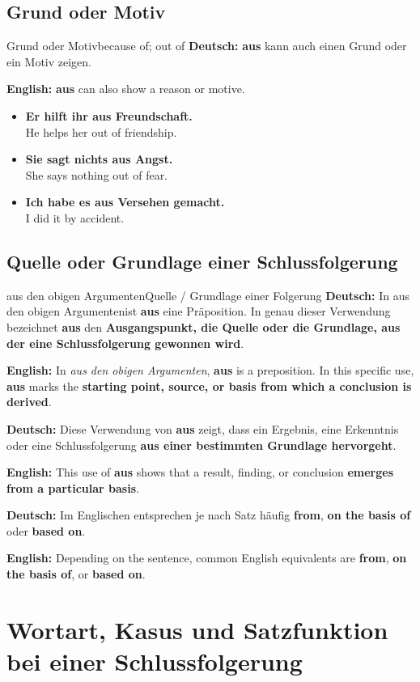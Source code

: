 \documentclass[a4paper,11pt]{article}
\newcommand{\GermanText}[1]{\textbf{Deutsch: }#1\par}
\newcommand{\EnglishText}[1]{{\small\color{SoftGray}\textbf{English: }#1\par}}
\newcommand{\ExampleItem}[2]{\item \textbf{#1}\\{\small\color{SoftGray}#2}}
\begin{document}
\subsection{Grund oder Motiv}
\begin{grammarentry}{Grund oder Motiv}{because of; out of}
\GermanText{\textbf{aus} kann auch einen Grund oder ein Motiv zeigen.}
\EnglishText{\textbf{aus} can also show a reason or motive.}
\end{grammarentry}
\begin{exbox}
\begin{itemize}
\ExampleItem{Er hilft ihr aus Freundschaft.}{He helps her out of friendship.}
\ExampleItem{Sie sagt nichts aus Angst.}{She says nothing out of fear.}
\ExampleItem{Ich habe es aus Versehen gemacht.}{I did it by accident.}
\end{itemize}
\end{exbox}

\subsection{Quelle oder Grundlage einer Schlussfolgerung}
\begin{grammarentry}{aus den obigen Argumenten}{Quelle / Grundlage einer Folgerung}
\GermanText{In \glqq aus den obigen Argumenten\grqq ist \textbf{aus} eine Präposition. In genau dieser Verwendung bezeichnet \textbf{aus} den \textbf{Ausgangspunkt, die Quelle oder die Grundlage, aus der eine Schlussfolgerung gewonnen wird}.}
\EnglishText{In \textit{aus den obigen Argumenten}, \textbf{aus} is a preposition. In this specific use, \textbf{aus} marks the \textbf{starting point, source, or basis from which a conclusion is derived}.}

\GermanText{Diese Verwendung von \textbf{aus} zeigt, dass ein Ergebnis, eine Erkenntnis oder eine Schlussfolgerung \textbf{aus einer bestimmten Grundlage hervorgeht}.}
\EnglishText{This use of \textbf{aus} shows that a result, finding, or conclusion \textbf{emerges from a particular basis}.}

\GermanText{Im Englischen entsprechen je nach Satz häufig \textbf{from}, \textbf{on the basis of} oder \textbf{based on}.}
\EnglishText{Depending on the sentence, common English equivalents are \textbf{from}, \textbf{on the basis of}, or \textbf{based on}.}
\end{grammarentry}

\section{Wortart, Kasus und Satzfunktion bei einer Schlussfolgerung}
\end{document}
